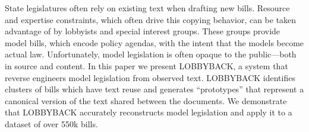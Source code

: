 State legislatures often rely on existing text when drafting new bills. Resource and expertise constraints, which often drive this copying behavior, can be taken advantage of by lobbyists and special interest groups. These groups provide model bills, which encode policy agendas, with the intent that the models become actual law. Unfortunately, model legislation is often opaque to the public---both in source and content. In this paper we present LOBBYBACK, a system that reverse engineers model legislation from observed text. LOBBYBACK identifies clusters of bills which have text reuse and generates ``prototypes'' that represent a canonical version of the text shared between the documents. We demonstrate that LOBBYBACK accurately reconstructs model legislation and apply it to a dataset of over 550k bills.
